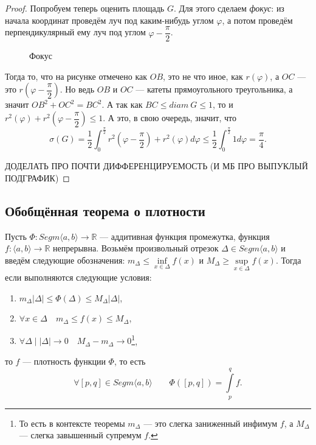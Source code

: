 \begin{proof}
	Попробуем теперь оценить площадь \(G\).	Для этого сделаем \textit{фокус}: из начала координат проведём луч под каким-нибудь углом \(\varphi\), а потом проведём перпендикулярный ему луч под углом \(\varphi - \dfrac{\pi}{2}\).
	\begin{figure}[h!]
		\caption{Фокус}
	\end{figure}
	
	Тогда то, что на рисунке отмечено как \(OB\), это не что иное, как \(r(\varphi)\), а \(OC\) --- это \(r \left(\varphi - \dfrac{\pi}{2} \right)\). Но ведь \(OB\) и \(OC\) --- катеты прямоугольного треугольника, а значит \({OB}^2 + {OC}^2 = {BC}^2\). А так как \(BC \leqslant diam \ G \leqslant 1\), то и \(r^2(\varphi) + r^2 \left(\varphi - \dfrac{\pi}{2} \right) \leqslant 1\). А это, в свою очередь, значит, что \[
	\sigma(G) = \frac{1}{2} \int_{0}^{\frac{\pi}{2}} r^2 \left(\varphi - \frac{\pi}{2} \right) +  r^2(\varphi) d\varphi \leqslant \frac{1}{2} \int_{0}^{\frac{\pi}{2}} 1 d\varphi = \frac{\pi}{4}.
	\]
	
	ДОДЕЛАТЬ ПРО ПОЧТИ ДИФФЕРЕНЦИРУЕМОСТЬ (И МБ ПРО ВЫПУКЛЫЙ ПОДГРАФИК)
\end{proof}

\subsection{Обобщённая теорема о плотности}

\hypertarget{plotn}{}
\begin{theorem}
	Пусть \(\Phi \colon Segm \langle a, b \rangle \to \mathbb{R}\) --- аддитивная функция промежутка, функция \(f \colon \langle a, b \rangle \to \mathbb{R}\) непрерывна. Возьмём произвольный отрезок \(\Delta \in Segm \langle a, b \rangle\) и введём следующие обозначения: \(m_\Delta \leqslant \inf\limits_{x \in \Delta} f(x)\) и \(M_\Delta \geqslant \sup\limits_{x \in \Delta} f(x)\). Тогда если выполняются следующие условия:
	\begin{enumerate}
		\item \label{plotn_1} \(m_\Delta |\Delta| \leqslant \Phi(\Delta) \leqslant M_\Delta |\Delta|\),
		\item \label{plotn_2} \(\forall x \in \Delta \quad m_\Delta \leqslant f(x) \leqslant M_\Delta\),
		\item \label{plotn_3} \(\forall \Delta \mid |\Delta| \to 0 \quad M_\Delta - m_\Delta \to 0\)\footnote{То есть в контексте теоремы \(m_\Delta\) --- это слегка заниженный инфимум \(f\), а \(M_\Delta\) --- слегка завышенный супремум \(f\).},
	\end{enumerate}
	то \(f\) --- плотность функции \(\Phi\), то есть \[
	\forall [p, q] \in Segm \langle a, b \rangle \qquad \Phi([p, q]) = \int\limits_p^q f.
	\]
\end{theorem}

